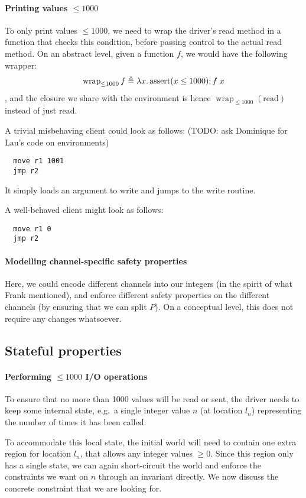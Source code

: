 \documentclass{article}
\newcommand{\X}[1]{\ensuremath{\mathrm{#1}}}
\newcommand{\wrap}[1]{\operatorname{wrap}_{\mathrm{#1}}}
\begin{document}
\paragraph{Printing values $\le 1000$}

To only print values $\le 1000$, we need to wrap the driver's read method in a
function that checks this condition, before passing control to the actual read
method.
On an abstract level, given a function $f$, we would have the following wrapper:
\[
  \wrap{\le 1000} f \eqdef \lambda x\ldotp \X{assert}(x \le 1000); f\; x
\]
, and the closure we share with the environment is hence $\wrap{\le
  1000}(\X{read})$ instead of just $\X{read}$.

A trivial misbehaving client could look as follows:
(TODO: ask Dominique for Lau's code on environments)
\begin{lstlisting}
  move r1 1001
  jmp r2
\end{lstlisting}
It simply loads an argument to write and jumps to the write routine.

A well-behaved client might look as follows:
\begin{lstlisting}
  move r1 0
  jmp r2
\end{lstlisting}

\paragraph{Modelling channel-specific safety properties}
Here, we could encode different channels into our integers (in the spirit of
what Frank mentioned), and enforce different safety properties on the different
channels (by ensuring that we can split $P$).
On a conceptual level, this does not require any changes whatsoever.

\subsection{Stateful properties}

\paragraph{Performing $\le 1000$ I/O operations}

To ensure that no more than 1000 values will be read or sent, the driver needs to
keep some internal state, e.g.\ a single integer value $n$ (at location $l_n$) representing the number of times it has been called.

To accommodate this local state, the initial world will need to contain one
extra region for location $l_n$, that allows any integer values $\ge 0$. Since
this region only has a single state, we can again short-circuit the world and
enforce the constraints we want on $n$ through an invariant directly. We now
discuss the concrete constraint that we are looking for.
\end{document}
